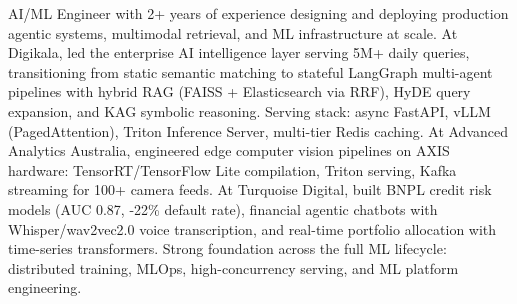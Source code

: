 \small{AI/ML Engineer with 2+ years of experience designing and deploying production agentic systems, multimodal retrieval, and ML infrastructure at scale. At Digikala, led the enterprise AI intelligence layer serving 5M+ daily queries, transitioning from static semantic matching to stateful LangGraph multi-agent pipelines with hybrid RAG (FAISS + Elasticsearch via RRF), HyDE query expansion, and KAG symbolic reasoning. Serving stack: async FastAPI, vLLM (PagedAttention), Triton Inference Server, multi-tier Redis caching. At Advanced Analytics Australia, engineered edge computer vision pipelines on AXIS hardware: TensorRT/TensorFlow Lite compilation, Triton serving, Kafka streaming for 100+ camera feeds. At Turquoise Digital, built BNPL credit risk models (AUC 0.87, -22\% default rate), financial agentic chatbots with Whisper/wav2vec2.0 voice transcription, and real-time portfolio allocation with time-series transformers. Strong foundation across the full ML lifecycle: distributed training, MLOps, high-concurrency serving, and ML platform engineering.}\vspace{4pt}